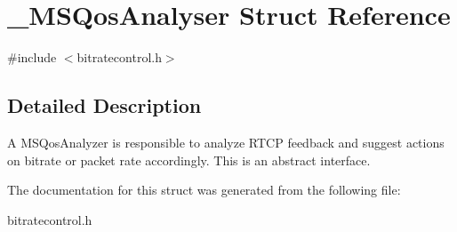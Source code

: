 \section{\_\-MSQosAnalyser Struct Reference}
\label{struct__MSQosAnalyser}


{\ttfamily \#include $<$bitratecontrol.h$>$}

\subsection{Detailed Description}
A MSQosAnalyzer is responsible to analyze RTCP feedback and suggest actions on bitrate or packet rate accordingly. This is an abstract interface. 

The documentation for this struct was generated from the following file:\begin{DoxyCompactItemize}
\item 
bitratecontrol.h\end{DoxyCompactItemize}
